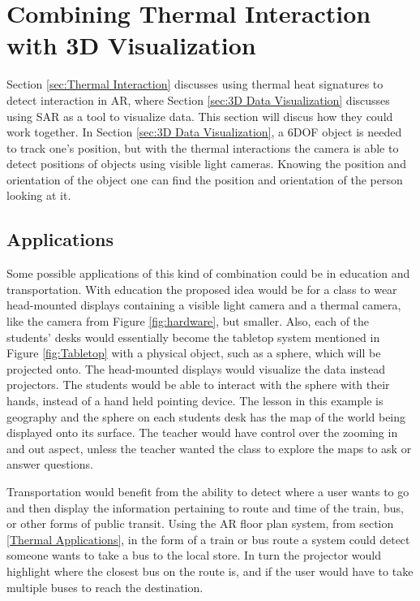 \documentclass{sig-alternate}
\begin{document}
\section{Combining Thermal Interaction with 3D Visualization}
\label{sec:Joining Together} 
Section \ref{sec:Thermal Interaction} discusses using thermal heat signatures to detect interaction in AR, where Section \ref{sec:3D Data Visualization} discusses using SAR as a tool to visualize data. This section will discus how they could work together. In Section \ref{sec:3D Data Visualization}, a 6DOF object is needed to track one's position, but with the thermal interactions the camera is able to detect positions of objects using visible light cameras. Knowing the position and orientation of the object one can find the position and orientation of the person looking at it.   

\subsection{Applications}
\label{Applications}
Some possible applications of this kind of combination could be in education and transportation. With education the proposed idea would be for a class to wear head-mounted displays containing a visible light camera and a thermal camera, like the camera from Figure \ref{fig:hardware}, but smaller. Also, each of the students’ desks would essentially become the tabletop system mentioned in Figure \ref{fig:Tabletop} with a physical object, such as a sphere, which will be projected onto. The head-mounted displays would visualize the data instead projectors. The students would be able to interact with the sphere with their hands, instead of a hand held pointing device. The lesson in this example is geography and the sphere on each students desk has the map of the world being displayed onto its surface. The teacher would have control over the zooming in and out aspect, unless the teacher wanted the class to explore the maps to ask or answer questions.

Transportation would benefit from the ability to detect where a user wants to go and then display the information pertaining to route and time of the train, bus, or other forms of public transit. Using the AR floor plan system, from section \ref{Thermal Applications}, in the form of a train or bus route a system could detect someone wants to take a bus to the local store. In turn the projector would highlight where the closest bus on the route is, and if the user would have to take multiple buses to reach the destination.
\end{document}

